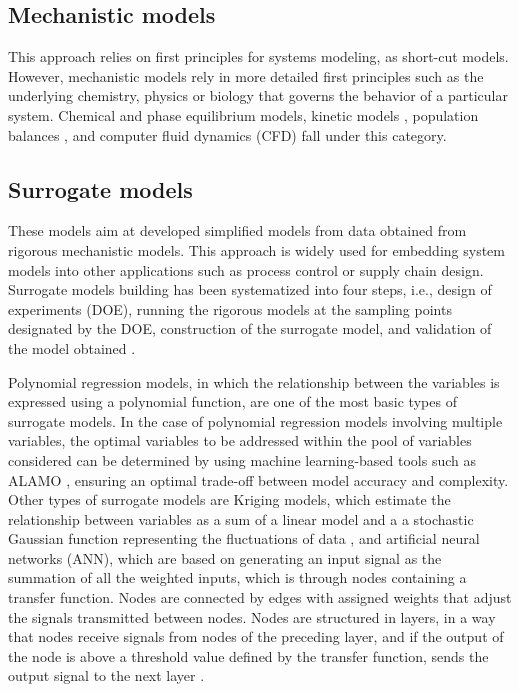 \begin{refsection}[referencesCh1]
\subsection{Mechanistic models}
This approach relies on first principles for systems modeling, as short-cut models. However, mechanistic models rely in more detailed first principles such as the underlying chemistry, physics or biology that governs the behavior of a particular system. Chemical \citep{loeppert1995chemical} and phase \citep{brignole2013phase} equilibrium models, kinetic models \citep{buzzi2009kinetic}, population balances \citep{ramkrishna2000population}, and computer fluid dynamics (CFD) \citep{anderson1995computational} fall under this category.

\subsection{Surrogate models}
These models aim at developed simplified models from data obtained from rigorous mechanistic models. This approach is widely used for embedding system models into other applications such as process control or supply chain design. Surrogate models building has been systematized into four steps, i.e., design of experiments (DOE), running the rigorous models at the sampling points designated by the DOE, construction of the surrogate model, and validation of the model obtained \citep{queipo2005surrogate}.

Polynomial regression models, in which the relationship between the variables is expressed using a polynomial function, are one of the most basic types of surrogate models. In the case of polynomial regression models involving multiple variables, the optimal variables to be addressed within the pool of variables considered can be determined by using machine learning-based tools such as ALAMO \citep{wilson2017alamo}, ensuring an optimal trade-off between model accuracy and complexity. Other types of surrogate models are Kriging models, which estimate the relationship between variables as a sum of a linear model and a a stochastic Gaussian function representing the fluctuations of data \citep{quirante2015rigorous}, and artificial neural networks (ANN), which are based on  generating an input signal as the summation of all the
weighted inputs, which is through nodes containing a transfer function. Nodes are connected by edges with assigned weights that adjust the signals transmitted between nodes. Nodes are structured in layers, in a way that nodes receive signals from nodes of the preceding layer, and if the output of the node is above a threshold value defined by the transfer function, sends the output signal to the next layer \citep{himmelblau2000applications}.


\end{refsection}
